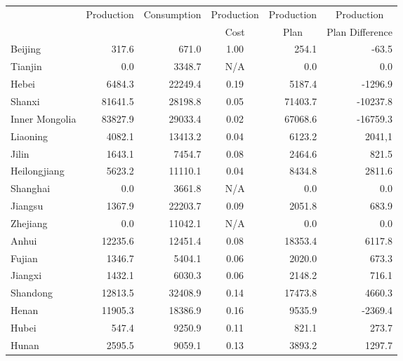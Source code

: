 \documentclass[review,hidelinks,onefignum,onetabnum]{siamart220329}
\begin{document}
\begin{table}[t]
\renewcommand\arraystretch{1.25}
\begin{scriptsize}
  \centering
    \begin{tabular}{l|rrcrr}
    	\hline
	\rule[-1ex]{0pt}{2.5ex} 
          & \multirow{2}{*}{Production} & \multirow{2}{*}{Consumption} & \multicolumn{1}{c}{Production} & \multicolumn{1}{c}{Production} & \multicolumn{1}{c}{Production} \\
        &   &   &  \multicolumn{1}{c}{Cost} &\multicolumn{1}{c}{Plan} & \multicolumn{1}{c}{Plan Difference} \\
    \hline
    Beijing  & 317.6 & 671.0  & 1.00  &  254.1  & -63.5 \\
    Tianjin  & 0.0   & 3348.7 & N/A   & 0.0   & 0.0  \\
    Hebei  & 6484.3  & 22249.4  & 0.19  & 5187.4  &  -1296.9 \\
    Shanxi  & 81641.5  & 28198.8  & 0.05  & 71403.7  &  -10237.8\\
    Inner Mongolia  & 83827.9  & 29033.4  & 0.02  & 67068.6  & -16759.3  \\
    Liaoning  & 4082.1  & 13413.2  & 0.04  & 6123.2 & 2041,1 \\
    Jilin  & 1643.1  & 7454.7  & 0.08  & 2464.6 & 821.5  \\
    Heilongjiang  & 5623.2  & 11110.1  & 0.04  & 8434.8  & 2811.6 \\
    Shanghai  & 0.0   & 3661.8  & N/A   & 0.0   & 0.0  \\
    Jiangsu  & 1367.9  & 22203.7  & 0.09  &   2051.8  & 683.9 \\
    Zhejiang  & 0.0   & 11042.1  & N/A   & 0.0   & 0.0  \\
    Anhui  & 12235.6  & 12451.4  & 0.08  & 18353.4  & 6117.8\\
    Fujian  & 1346.7  & 5404.1  & 0.06  & 2020.0 &  673.3\\
    Jiangxi & 1432.1  & 6030.3  & 0.06  & 2148.2  &  716.1 \\
    Shandong  & 12813.5  & 32408.9  & 0.14  & 17473.8 &  4660.3 \\
    Henan  & 11905.3  & 18386.9 & 0.16  & 9535.9  & -2369.4 \\
    Hubei  & 547.4  & 9250.9  & 0.11  &  821.1  & 273.7 \\
    Hunan  & 2595.5  & 9059.1  & 0.13  &  3893.2  &  1297.7\\

\end{tabular}
\end{scriptsize}
\end{table}
\end{document}
